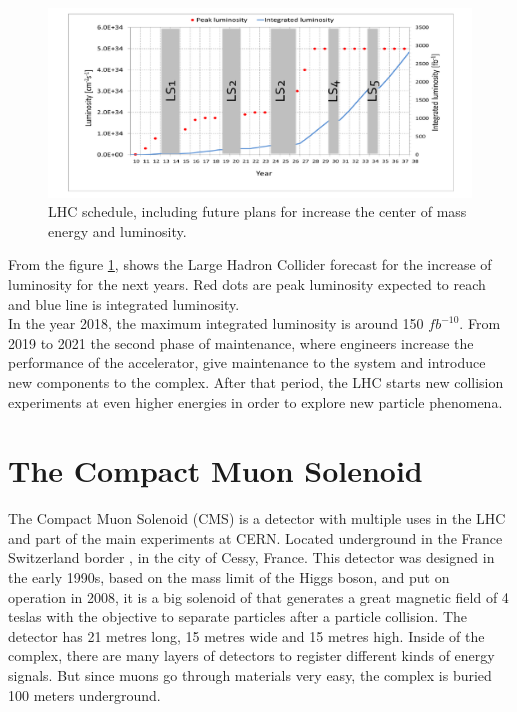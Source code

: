 \begin{linenumbers}
\begin{figure}[!htbp]
\centering
\includegraphics[scale=0.5]{Chapter2/lum6.png}
\caption{LHC schedule, including future plans for increase the center of mass energy and luminosity. %
\cite{cern3}}
\label{lhc-lumi}
\end{figure}
From the figure \ref{lhc-lumi}, shows the Large Hadron Collider forecast for the increase of luminosity for the next years. Red dots are peak luminosity expected to reach and blue line is integrated luminosity.  \\
In the year 2018, the maximum integrated luminosity is around 150 $fb^{-10}$\cite{cern3}. From 2019 to 2021 the second phase of maintenance, where engineers increase the performance of the accelerator, give maintenance to the system and introduce new components to the complex. After that period, the LHC starts new collision experiments at even higher energies in order to explore new particle phenomena.


\pagebreak

\section{The Compact Muon Solenoid}	
The Compact Muon Solenoid (CMS) is a detector with multiple uses in the LHC and part of the main experiments at CERN. Located underground in the France Switzerland border , in the city of Cessy, France.
This detector was designed in the early 1990s, based on the mass limit of the Higgs boson,  and put on operation in 2008,  it is a big solenoid of  that generates a great magnetic field of 4 teslas with the objective to separate particles after a particle collision.
 The detector has 21 metres long, 15 metres wide and 15 metres high.
Inside of the complex, there are many layers of detectors to register different kinds of energy signals. But since muons go through materials very easy, the complex is buried 100 meters underground.\\ 


\end{linenumbers}
